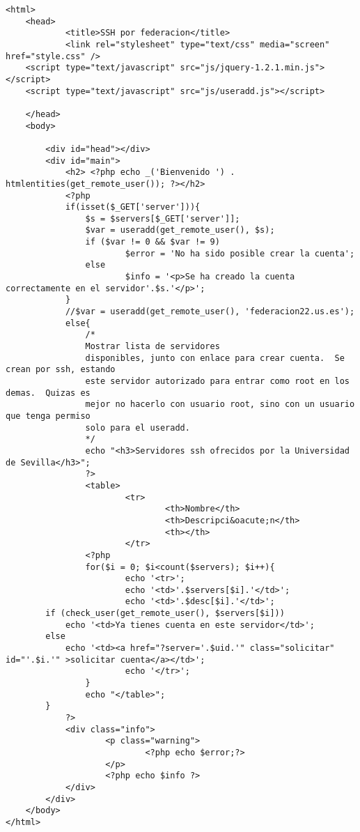 \begin{lstlisting}
<html>
    <head>
            <title>SSH por federacion</title>
            <link rel="stylesheet" type="text/css" media="screen" href="style.css" />
    <script type="text/javascript" src="js/jquery-1.2.1.min.js"></script>
    <script type="text/javascript" src="js/useradd.js"></script>

    </head>
    <body>

        <div id="head"></div>
        <div id="main">
            <h2> <?php echo _('Bienvenido ') . htmlentities(get_remote_user()); ?></h2>
            <?php
            if(isset($_GET['server'])){
                $s = $servers[$_GET['server']];
                $var = useradd(get_remote_user(), $s);
                if ($var != 0 && $var != 9)
                        $error = 'No ha sido posible crear la cuenta';
                else
                        $info = '<p>Se ha creado la cuenta correctamente en el servidor'.$s.'</p>';
            }
            //$var = useradd(get_remote_user(), 'federacion22.us.es');
            else{
                /*
                Mostrar lista de servidores
                disponibles, junto con enlace para crear cuenta.  Se crean por ssh, estando
                este servidor autorizado para entrar como root en los demas.  Quizas es
                mejor no hacerlo con usuario root, sino con un usuario que tenga permiso
                solo para el useradd.
                */
                echo "<h3>Servidores ssh ofrecidos por la Universidad de Sevilla</h3>";
                ?>
                <table>
                        <tr>
                                <th>Nombre</th>
                                <th>Descripci&oacute;n</th>
                                <th></th>
                        </tr>
                <?php
                for($i = 0; $i<count($servers); $i++){
                        echo '<tr>';
                        echo '<td>'.$servers[$i].'</td>';
                        echo '<td>'.$desc[$i].'</td>';
        if (check_user(get_remote_user(), $servers[$i]))
            echo '<td>Ya tienes cuenta en este servidor</td>';
        else
            echo '<td><a href="?server='.$uid.'" class="solicitar" id="'.$i.'" >solicitar cuenta</a></td>';
                        echo '</tr>';
                }
                echo "</table>";
        }
            ?>
            <div class="info">
                    <p class="warning">
                            <?php echo $error;?>
                    </p>
                    <?php echo $info ?>
            </div>
        </div>
    </body>
</html>

    \end{lstlisting}

